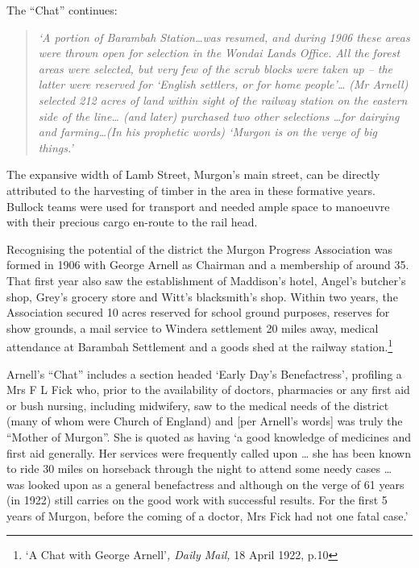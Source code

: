 The ``Chat'' continues:



\begin{quote}

\emph{`A portion of Barambah Station\ldots was resumed, and during 1906 these areas were thrown open for selection in the Wondai Lands Office. All the forest areas were selected, but very few of the scrub blocks were taken up -- the latter were reserved for `English settlers, or for home people'\ldots{} (Mr Arnell) selected 212 acres of land within sight of the railway station on the eastern side of the line\ldots{} (and later) purchased two other selections \ldots for dairying and farming\ldots(In his prophetic words) `Murgon is on the verge of big things.'}

\end{quote}



The expansive width of Lamb Street, Murgon's main street, can be directly attributed to the harvesting of timber in the area in these formative years. Bullock teams were used for transport and needed ample space to manoeuvre with their precious cargo en-route to the rail head.



Recognising the potential of the district the Murgon Progress Association was formed in 1906 with George Arnell as Chairman and a membership of around 35. That first year also saw the establishment of Maddison's hotel, Angel's butcher's shop, Grey's grocery store and Witt's blacksmith's shop. Within two years, the Association secured 10 acres reserved for school ground purposes, reserves for show grounds, a mail service to Windera settlement 20 miles away, medical attendance at Barambah Settlement and a goods shed at the railway station.\footnote{`A Chat with George Arnell'\emph{, Daily Mail,} 18 April 1922, p.10}


Arnell's ``Chat'' includes a section headed `Early Day's Benefactress', profiling a Mrs F L Fick who, prior to the availability of doctors, pharmacies or any first aid or bush nursing, including midwifery, saw to the medical needs of the district (many of whom were Church of England) and {[}per Arnell's words{]} was truly the ``Mother of Murgon''. She is quoted as having `a good knowledge of medicines and first aid generally. Her services were frequently called upon \ldots{} she has been known to ride 30 miles on horseback through the night to attend some needy cases \ldots{} was looked upon as a general benefactress and although on the verge of 61 years (in 1922) still carries on the good work with successful results. For the first 5 years of Murgon, before the coming of a doctor, Mrs Fick had not one fatal case.'



